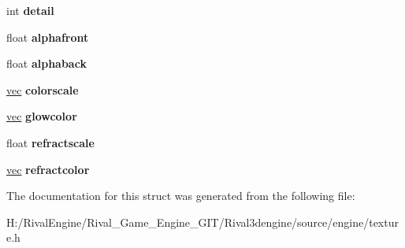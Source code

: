 \begin{DoxyCompactItemize}
\item 
\mbox{\label{struct_v_slot_adc24249e95e72904e5887fe3c3535ce5}} 
int {\bfseries detail}
\item 
\mbox{\label{struct_v_slot_acfa4240cbb95155c901039bf9b7d4a6c}} 
float {\bfseries alphafront}
\item 
\mbox{\label{struct_v_slot_a892340f88c0efde59bca90470ca35a85}} 
float {\bfseries alphaback}
\item 
\mbox{\label{struct_v_slot_a3f118ae0fc70870193e817e0b0da3f67}} 
\hyperlink{structvec}{vec} {\bfseries colorscale}
\item 
\mbox{\label{struct_v_slot_a9cea3269f7619be79bb504536c8e6c29}} 
\hyperlink{structvec}{vec} {\bfseries glowcolor}
\item 
\mbox{\label{struct_v_slot_ac0af24b72dbe4111f9369dcc9e2b04a0}} 
float {\bfseries refractscale}
\item 
\mbox{\label{struct_v_slot_ad63f26d0a28e69cac0c145ee3bb84faf}} 
\hyperlink{structvec}{vec} {\bfseries refractcolor}
\end{DoxyCompactItemize}


The documentation for this struct was generated from the following file\+:\begin{DoxyCompactItemize}
\item 
H\+:/\+Rival\+Engine/\+Rival\+\_\+\+Game\+\_\+\+Engine\+\_\+\+G\+I\+T/\+Rival3dengine/source/engine/texture.\+h\end{DoxyCompactItemize}
